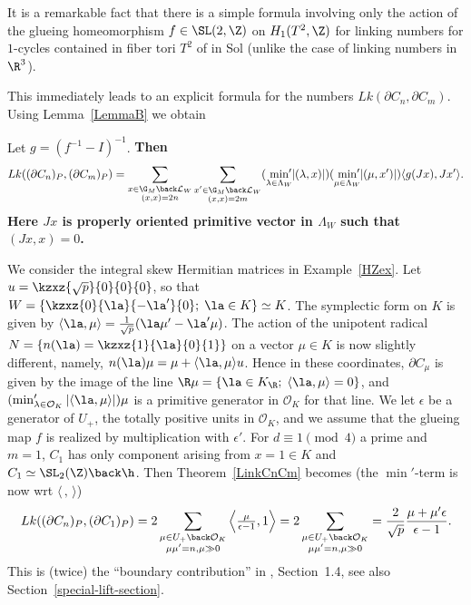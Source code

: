 It is a remarkable fact that there is a simple formula involving
only the action of the
glueing homeomorphism $f \in  \SL(2,\Z)$ on $H_1(T^2, \Z)$ for
linking numbers for $1$-cycles contained in fiber tori $T^2$ of in
Sol (unlike the case of linking numbers in $\R^3$).

This immediately leads to an explicit formula for the numbers
$Lk(\partial C_n, \partial C_m)$. Using Lemma~\ref{LemmaB} we obtain

\begin{theorem}\label{LinkCnCm} 
Let $g = (f^{-1} - I)^{-1}$. \bf{Then}
 \[
 Lk( (\partial C_n)_P, (\partial C_m)_P) = \sum_{ \substack{x\in \G_M \back \mathcal{L}_W \\ (x,x)=2n}} \sum_{\substack{x'\in \G_M \back \mathcal{L}_W \\ (x,x)=2m}} (\min_{\lambda \in \Lambda_W}  {\hspace{-5pt}'}
 |(\lambda,x)|) (\min_{\mu \in \Lambda_W}  {\hspace{-5pt}'}
|(\mu,x')|) \langle g(Jx),Jx' \rangle. 
\]
Here $Jx$ is properly oriented primitive vector in $\Lambda_W$ such that $(Jx,x)=0$. 
 \end{theorem}

 \begin{example}\label{LinkCnCmex} 
We consider the integral skew Hermitian matrices in Example~\ref{HZex}.
Let $u= \kzxz{\sqrt{p}}{0}{0}{0}$, so that $W = \{
\kzxz{0}{\la}{-\la'}{0};\; \la \in K \} \simeq K$. The symplectic
form on $K$ is given by $\langle \la, \mu \rangle = \frac{1}{\sqrt{p}}
(\la \mu' - \la'\mu)$. The action of the unipotent radical $N=
\left\{ n(\la)= \kzxz{1}{\la}{0}{1} \right\}$ on a vector $\mu \in
K$ is now slightly different, namely, $n(\la) \mu = \mu + \langle
\la, \mu \rangle u$. Hence in these coordinates, $\partial C_{\mu}$
is given by the image of the line $\R \mu = \{\la \in K_\R; \;
\langle \la, \mu \rangle =0 \}$, and $(\min'_{\lambda \in \mathcal{O}_K}
 |\langle \la, \mu \rangle|)\mu$ is a primitive generator in
 $\mathcal{O}_K$ for that line. We let $\epsilon$ be a generator of
 $U_+$, the totally positive units in $\mathcal{O}_K$, and we assume
 that the glueing map $f$ is realized by multiplication with $\epsilon'$.
 For $d \equiv 1 \pmod{4}$ a prime and $m=1$, $C_1$ has only component
 arising from $x =1 \in K$ and $C_1 \simeq \SL_2(\Z) \back \h$.
 Then Theorem~\ref{LinkCnCm} becomes (the $\min'$-term is now wrt
 $\langle\,,\, \rangle$)
\[
 Lk( (\partial C_n)_P, (\partial C_1)_P) = 
 2 \sum_{ \substack{\mu \in U_+ \back \mathcal{O}_K\\ \mu\mu'=n, \mu \gg 0}} \left\langle \tfrac{\mu}{\epsilon-1}, 1 \right\rangle = 2\sum_{ \substack{\mu \in U_+ \back \mathcal{O}_K\\ \mu\mu'=n, \mu \gg0}}  = \frac{2}{\sqrt{p}}\frac{\mu+\mu'\epsilon}{\epsilon-1}.
\]
This is (twice) the ``boundary contribution'' in \cite{HZ},
Section~1.4, see also Section~\ref{special-lift-section}.
\end{example}


